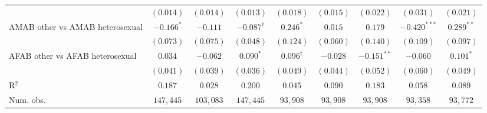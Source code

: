 \begin{table}[htpb!]
{\begin{tabular}{l c c c c c c c c}
 & $(0.014)$ & $(0.014)$ & $(0.013)$ & $(0.018)$ & $(0.015)$ & $(0.022)$ & $(0.031)$ & $(0.021)$ \\
AMAB other vs AMAB heterosexual & $-0.166^{*}$ & $-0.111$ & $-0.087^{\dagger}$ & $0.246^{*}$ & $0.015$ & $0.179$ & $-0.420^{***}$ & $0.289^{**}$ \\
 & $(0.073)$ & $(0.075)$ & $(0.048)$ & $(0.124)$ & $(0.060)$ & $(0.140)$ & $(0.109)$ & $(0.097)$ \\
AFAB other vs AFAB heterosexual & $0.034$ & $-0.062$ & $0.090^{*}$ & $0.096^{\dagger}$ & $-0.028$ & $-0.151^{**}$ & $-0.060$ & $0.101^{*}$ \\
 & $(0.041)$ & $(0.039)$ & $(0.036)$ & $(0.049)$ & $(0.044)$ & $(0.052)$ & $(0.060)$ & $(0.049)$ \\
\hline
R$^2$ & $0.187$ & $0.028$ & $0.200$ & $0.045$ & $0.090$ & $0.183$ & $0.058$ & $0.089$ \\
Num. obs. & $147,445$ & $103,083$ & $147,445$ & $93,908$ & $93,908$ & $93,908$ & $93,358$ & $93,772$ \\
\hline
\end{tabular}%
}
\par\vspace{1ex}
\begin{minipage}{\textwidth}\footnotesize\raggedright

\end{minipage}
\end{table}

